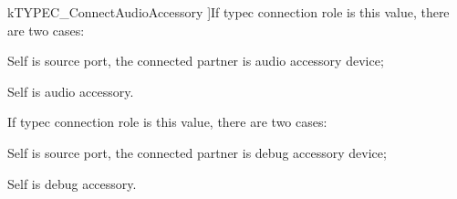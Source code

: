 \begin{Desc}
\begin{description}
{\hypertarget{group__usb__pd__stack_gga5dcf4d70a373001cfde169f0e8b9a1baaec27082d89b892747d115c26290da78f}{k\-T\-Y\-P\-E\-C\-\_\-\-Connect\-Audio\-Accessory}\label{group__usb__pd__stack_gga5dcf4d70a373001cfde169f0e8b9a1baaec27082d89b892747d115c26290da78f}
}]If typec connection role is this value, there are two cases\-:
\begin{DoxyItemize}
\item Self is source port, the connected partner is audio accessory device;
\item Self is audio accessory. 
\end{DoxyItemize}\item[{\em 
\hypertarget{group__usb__pd__stack_gga5dcf4d70a373001cfde169f0e8b9a1baa2bfe3fb0aa9780231c7c87e8803bd591}{k\-T\-Y\-P\-E\-C\-\_\-\-Connect\-Debug\-Accessory}\label{group__usb__pd__stack_gga5dcf4d70a373001cfde169f0e8b9a1baa2bfe3fb0aa9780231c7c87e8803bd591}
}]If typec connection role is this value, there are two cases\-:
\begin{DoxyItemize}
\item Self is source port, the connected partner is debug accessory device;
\item Self is debug accessory. 
\end{DoxyItemize}\end{description}
\end{Desc}

